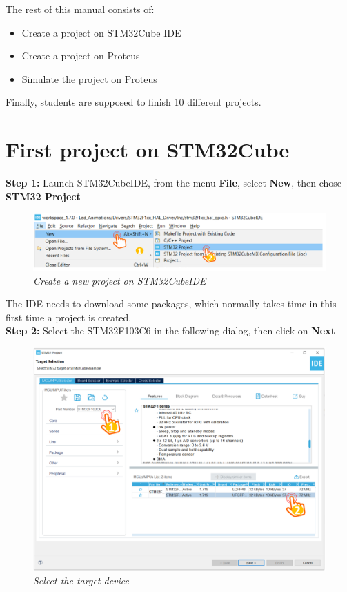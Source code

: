 The rest of this manual consists of:
\begin{itemize}
    \item Create a project on STM32Cube IDE
    \item Create a project on Proteus
    \item Simulate the project on Proteus
\end{itemize}

Finally, students are supposed to finish 10 different projects. 

\newpage
\section{First project on STM32Cube}
\textbf{Step 1: } Launch STM32CubeIDE, from the menu \textbf{File}, select \textbf{New}, then chose \textbf{STM32 Project} 

\begin{figure}[!htp]
    \centering
    \includegraphics[width=5in]{source/picture/bai_1/stm_01.PNG}
    \caption{\textit{Create a new project on STM32CubeIDE}}
    \label{bai1_stm1}
\end{figure}

The IDE needs to download some packages, which normally takes time in this first time a project is created.\\

\textbf{Step 2: } Select the STM32F103C6 in the following dialog, then click on \textbf{Next}

\begin{figure}[!htp]
    \centering
    \includegraphics[width=5in]{source/picture/bai_1/stm_02.PNG}
    \caption{\textit{Select the target device}}
    \label{bai1_stm2}
\end{figure}

